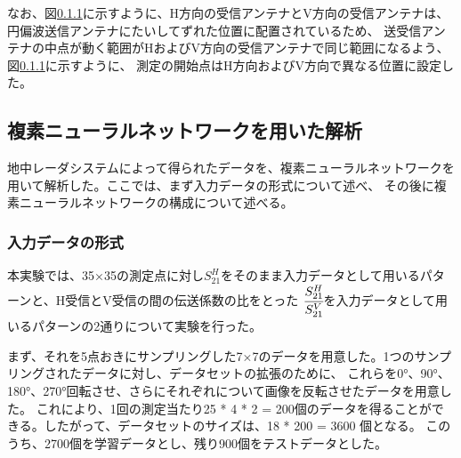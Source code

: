 \documentclass[11pt,a4paper,uplatex,draft]{ujarticle}
\begin{document}
  なお、図\ref{}に示すように、H方向の受信アンテナとV方向の受信アンテナは、円偏波送信アンテナにたいしてずれた位置に配置されているため、
  送受信アンテナの中点が動く範囲がHおよびV方向の受信アンテナで同じ範囲になるよう、図\ref{}に示すように、
  測定の開始点はH方向およびV方向で異なる位置に設定した。


  \subsection{複素ニューラルネットワークを用いた解析}
  地中レーダシステムによって得られたデータを、複素ニューラルネットワークを用いて解析した。ここでは、まず入力データの形式について述べ、
  その後に複素ニューラルネットワークの構成について述べる。
  \subsubsection{入力データの形式}
  本実験では、35×35の測定点に対し$S_{21}^{H}$をそのまま入力データとして用いるパターンと、H受信とV受信の間の伝送係数の比をとった
  $\cfrac{S_{21}^{H}}{S_{21}^{V}}$を入力データとして用いるパターンの2通りについて実験を行った。

  まず、それを5点おきにサンプリングした7×7のデータを用意した。1つのサンプリングされたデータに対し、データセットの拡張のために、
  これらを0°、90°、180°、270°回転させ、さらにそれぞれについて画像を反転させたデータを用意した。
  これにより、1回の測定当たり25 * 4 * 2 = 200個のデータを得ることができる。したがって、データセットのサイズは、18 * 200 = 3600 個となる。
  このうち、2700個を学習データとし、残り900個をテストデータとした。

  
\end{document}
